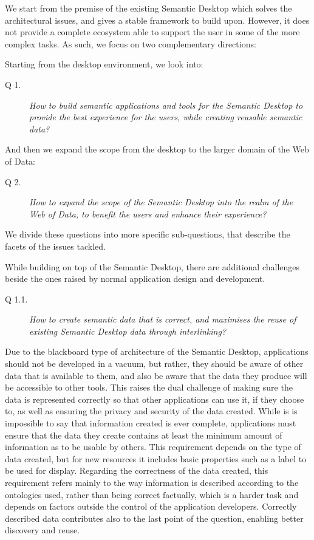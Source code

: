 We start from the premise of the existing Semantic Desktop which solves the architectural issues, and gives a stable framework to build upon. However, it does not provide a complete ecosystem able to support the user in some of the more complex tasks. As such, we focus on two complementary directions:

Starting from the desktop environment, we look into:
\begin{description}
 \item[Q 1.] \emph{How to build semantic applications and tools for the Semantic Desktop to provide the best experience for the users, while creating reusable semantic data?}
\end{description}
And then we expand the scope from the desktop to the larger domain of the Web of Data:
\begin{description}
 \item[Q 2.] \emph{How to expand the scope of the Semantic Desktop into the realm of the Web of Data, to benefit the users and enhance their experience?}
\end{description}
We divide these questions into more specific sub-questions, that describe the facets of the issues tackled.

While building on top of the Semantic Desktop, there are additional challenges beside the ones raised by normal application design and development.

\begin{description}
 \item[Q 1.1.] \emph{How to create semantic data that is correct, and maximises the reuse of existing Semantic Desktop data through interlinking?}
\end{description}

Due to the blackboard type of architecture of the Semantic Desktop, applications should not be developed in a vacuum, but rather, they should be aware of other data that is available to them, and also be aware that the data they produce will be accessible to other tools. This raises the dual challenge of making sure the data is represented correctly so that other applications can use it, if they choose to, as well as ensuring the privacy and security of the data created. While is is impossible to say that information created is ever complete, applications must ensure that the data they create contains at least the minimum amount of information as to be usable by others. This requirement depends on the type of data created, but for new resources it includes basic properties such as a label to be used for display. Regarding the correctness of the data created, this requirement refers mainly to the way information is described according to the ontologies used, rather than being correct factually, which is a 
harder task and depends on factors outside the control of the application developers. Correctly described data contributes also to the last point of the question, enabling better discovery and reuse. 

